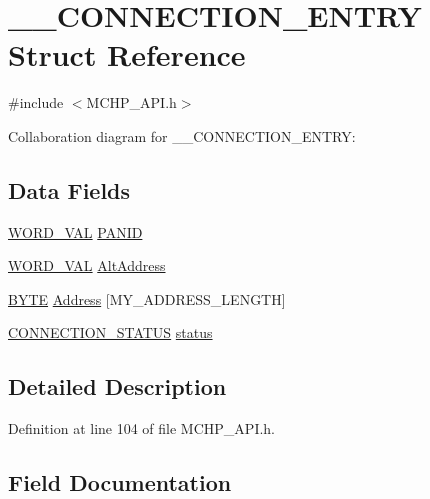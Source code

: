 \hypertarget{struct_____c_o_n_n_e_c_t_i_o_n___e_n_t_r_y}{}\section{\+\_\+\+\_\+\+C\+O\+N\+N\+E\+C\+T\+I\+O\+N\+\_\+\+E\+N\+T\+R\+Y Struct Reference}
\label{struct_____c_o_n_n_e_c_t_i_o_n___e_n_t_r_y}


{\ttfamily \#include $<$M\+C\+H\+P\+\_\+\+A\+P\+I.\+h$>$}



Collaboration diagram for \+\_\+\+\_\+\+C\+O\+N\+N\+E\+C\+T\+I\+O\+N\+\_\+\+E\+N\+T\+R\+Y\+:
\subsection*{Data Fields}
\begin{DoxyCompactItemize}
\item 
\hyperlink{union_w_o_r_d___v_a_l}{W\+O\+R\+D\+\_\+\+V\+A\+L} \hyperlink{struct_____c_o_n_n_e_c_t_i_o_n___e_n_t_r_y_a5a2b76ccf7e6b82de7ed819e1a10f56e}{P\+A\+N\+I\+D}
\item 
\hyperlink{union_w_o_r_d___v_a_l}{W\+O\+R\+D\+\_\+\+V\+A\+L} \hyperlink{struct_____c_o_n_n_e_c_t_i_o_n___e_n_t_r_y_a3586d069ee1b8d5dbe98aa6589dd5dd7}{Alt\+Address}
\item 
\hyperlink{_generic_type_defs_8h_a4ae1dab0fb4b072a66584546209e7d58}{B\+Y\+T\+E} \hyperlink{struct_____c_o_n_n_e_c_t_i_o_n___e_n_t_r_y_ac1d21f82df5bb86803475c1ee98f9dc5}{Address} \mbox{[}M\+Y\+\_\+\+A\+D\+D\+R\+E\+S\+S\+\_\+\+L\+E\+N\+G\+T\+H\mbox{]}
\item 
\hyperlink{_m_c_h_p___a_p_i_8h_af4f0ec0c8cecd06de64acaa16d012237}{C\+O\+N\+N\+E\+C\+T\+I\+O\+N\+\_\+\+S\+T\+A\+T\+U\+S} \hyperlink{struct_____c_o_n_n_e_c_t_i_o_n___e_n_t_r_y_a211425c904d6e6c235104591e0490149}{status}
\end{DoxyCompactItemize}


\subsection{Detailed Description}


Definition at line 104 of file M\+C\+H\+P\+\_\+\+A\+P\+I.\+h.



\subsection{Field Documentation}
\hypertarget{struct_____c_o_n_n_e_c_t_i_o_n___e_n_t_r_y_ac1d21f82df5bb86803475c1ee98f9dc5}{}
